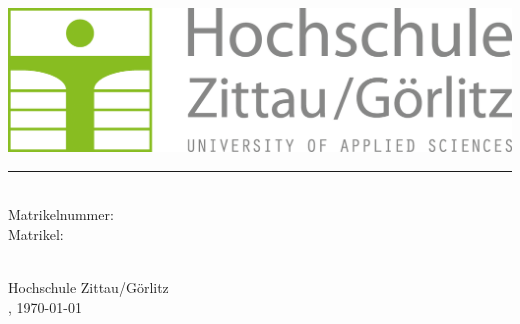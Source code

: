 \begin{titlepage}
    \begin{center}

        \vspace*{1cm}
        \includegraphics{images/hszg_logo.png}
        \vspace*{0.5cm}
        \hrule
        \vspace*{2cm}
        
        \Huge
        \textbf{\thesisTitle}
        
        \vspace*{0.5cm}
        \LARGE
        \thesisType

        \vspace*{2cm}
        
        \textbf{\authorName}\\
        Matrikelnummer: \authorMatrikeln\\
        Matrikel: \authorMatrikel\\
        
        \vfill
        
        \Large
        \faculty\\
        Hochschule Zittau/Görlitz\\
        \place, \today\\
        
    \end{center}
\end{titlepage}